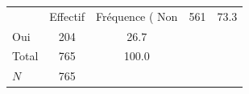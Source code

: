 {
\def\sym#1{\ifmmode^{#1}\else\(^{#1}\)\fi}
\begin{tabular}{l*{1}{cc}}
\toprule
            &    Effectif&Fréquence (%
\midrule
Non         &         561&        73.3\\
Oui         &         204&        26.7\\
Total       &         765&       100.0\\
\midrule
\(N\)       &         765&            \\
\bottomrule
\end{tabular}
}
